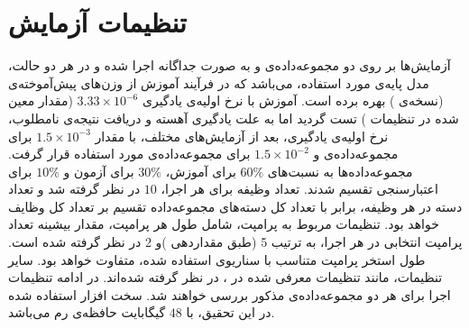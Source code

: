 \section{تنظیمات آزمایش}
آزمایش‌ها بر روی دو مجموعه‌داده‌ی \cite{hmdb51} و \cite{ucf101} به صورت جداگانه اجرا شده و در هر دو حالت، مدل پایه‌ی مورد استفاده،  \cite{open-vclip} می‌باشد که در فرآیند آموزش از وزن‌های پیش‌آموخته‌ی  \cite{clip} (نسخه‌ی ) بهره برده است. آموزش با نرخ اولیه‌ی یادگیری $3.33 \times 10^{-6}$ (مقدار معین شده در تنظیمات ) تست گردید اما به علت یادگیری آهسته و دریافت نتیجه‌ی نامطلوب، نرخ اولیه‌ی یادگیری، بعد از آزمایش‌های مختلف، با مقدار $1.5 \times 10^{-3}$ برای مجموعه‌داده‌ی  و $1.5 \times 10^{-2}$ برای مجموعه‌داده‌ی  مورد استفاده قرار گرفت. مجموعه‌داده‌ها به نسبت‌های $60\%$ برای آموزش، $30\%$ برای آزمون و $10\%$ برای اعتبارسنجی تقسیم شدند. تعداد وظیفه‌‌ برای هر اجرا، $10$ در نظر گرفته شد و تعداد دسته‌‌ در هر وظیفه‌، برابر با تعداد کل ‌دسته‌‌های مجموعه‌داده تقسیم بر تعداد کل وظایف خواهد بود. تنظیمات مربوط به پرامپت، شامل طول هر پرامپت، مقدار بیشینه‌ تعداد پرامپت انتخابی در هر اجرا، به ترتیب 5 (طبق مقداردهی  \cite{l2p})و 2 در نظر گرفته شده است.  طول استخر پرامپت متناسب با سناریوی استفاده شده، متفاوت خواهد بود. سایر تنظیمات، مانند تنظیمات معرفی شده در ، در نظر گرفته شده‌اند. در ادامه تنظیمات اجرا برای هر دو مجموعه‌داده‌ی مذکور بررسی خواهند شد. سخت افزار استفاده شده در این تحقیق،  با $48$ گیگابایت حافظه‌ی رم می‌باشد. 
